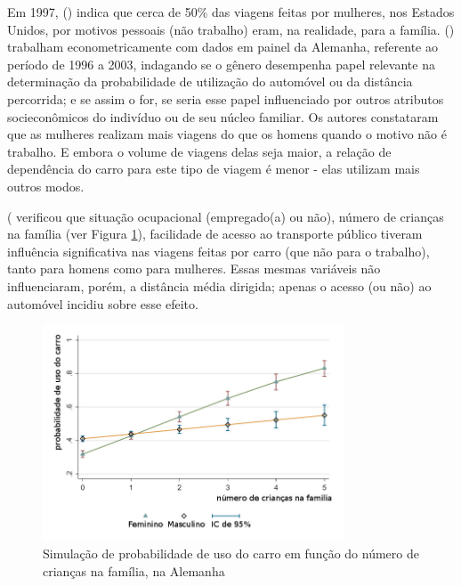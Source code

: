 

Em 1997,  (\citeyear{ROOT1999}) indica que cerca de 50\% das viagens feitas por mulheres, nos Estados Unidos, por motivos pessoais (não trabalho) eram, na realidade, para a família.
 (\citeyear{VANCE2007}) trabalham econometricamente com dados em painel da Alemanha, referente ao período de 1996 a 2003, indagando se o gênero desempenha papel relevante na determinação da probabilidade de utilização do automóvel ou da distância percorrida; e se assim o for, se seria esse papel influenciado por outros atributos socieconômicos do indivíduo ou de seu núcleo familiar. 
Os autores constataram que as mulheres realizam mais viagens do que os homens quando o motivo não é trabalho. E embora o volume de viagens delas seja maior, a relação de dependência do carro para este tipo de viagem é menor - elas utilizam mais outros modos.




 (\citeyear{VANCE2007} verificou que situação ocupacional (empregado(a) ou não), número de crianças na família (ver Figura \ref{fig:prob-uso-carro}), facilidade de acesso ao transporte público tiveram influência significativa nas viagens feitas por carro (que não para o trabalho), tanto para homens como para mulheres. Essas mesmas variáveis não influenciaram, porém, a distância média dirigida; apenas o acesso (ou não) ao automóvel incidiu sobre esse efeito. 

\begin{figure}[htb]%
    \caption{\label{fig:prob-uso-carro}Simulação de probabilidade de uso do carro em função do número de crianças na família, na Alemanha}%
    \begin{center}%
        \includegraphics[width=0.8\textwidth]{./imagens/prob-uso-carro.jpg}%
    \end{center}%
\end{figure}%

